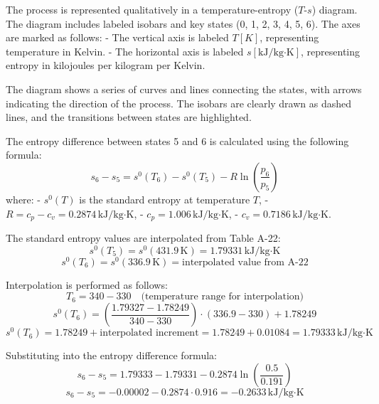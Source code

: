 The process is represented qualitatively in a temperature-entropy (\(T\)-\(s\)) diagram. The diagram includes labeled isobars and key states (0, 1, 2, 3, 4, 5, 6). The axes are marked as follows:  
- The vertical axis is labeled \(T [K]\), representing temperature in Kelvin.  
- The horizontal axis is labeled \(s [\text{kJ}/\text{kg·K}]\), representing entropy in kilojoules per kilogram per Kelvin.  

The diagram shows a series of curves and lines connecting the states, with arrows indicating the direction of the process. The isobars are clearly drawn as dashed lines, and the transitions between states are highlighted.

The entropy difference between states 5 and 6 is calculated using the following formula:  
\[
s_6 - s_5 = s^0(T_6) - s^0(T_5) - R \ln\left(\frac{p_6}{p_5}\right)
\]  
where:  
- \( s^0(T) \) is the standard entropy at temperature \( T \),  
- \( R = c_p - c_v = 0.2874 \, \text{kJ/kg·K} \),  
- \( c_p = 1.006 \, \text{kJ/kg·K} \),  
- \( c_v = 0.7186 \, \text{kJ/kg·K} \).  

The standard entropy values are interpolated from Table A-22:  
\[
s^0(T_5) = s^0(431.9 \, \text{K}) = 1.79331 \, \text{kJ/kg·K}
\]  
\[
s^0(T_6) = s^0(336.9 \, \text{K}) = \text{interpolated value from A-22}
\]  

Interpolation is performed as follows:  
\[
T_6 = 340 - 330 \quad \text{(temperature range for interpolation)}
\]  
\[
s^0(T_6) = \left(\frac{1.79327 - 1.78249}{340 - 330}\right) \cdot (336.9 - 330) + 1.78249
\]  
\[
s^0(T_6) = 1.78249 + \text{interpolated increment} = 1.78249 + 0.01084 = 1.79333 \, \text{kJ/kg·K}
\]  

Substituting into the entropy difference formula:  
\[
s_6 - s_5 = 1.79333 - 1.79331 - 0.2874 \ln\left(\frac{0.5}{0.191}\right)
\]  
\[
s_6 - s_5 = -0.00002 - 0.2874 \cdot 0.916 = -0.2633 \, \text{kJ/kg·K}
\]